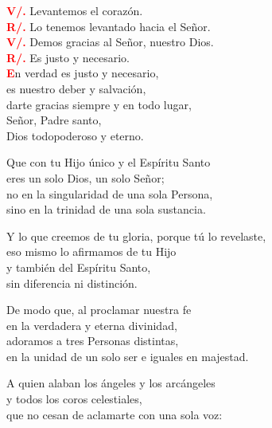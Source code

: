 \documentclass[12pt, letterpaper, spanish]{report}
\begin{document}
\Large \hspace{-0.9cm} {\bfseries \textcolor{red}{V/.}} \hspace{0.5cm} Levantemos el coraz\'on. \\
\Large \hspace{-0.9cm} {\bfseries \textcolor{red}{R/.}} \hspace{0.5cm} Lo tenemos levantado hacia el Se\~nor. \\

\Large \hspace{-0.9cm} {\bfseries \textcolor{red}{V/.}} \hspace{0.5cm} Demos gracias al Se\~nor, nuestro Dios. \\
\Large \hspace{-0.9cm} {\bfseries \textcolor{red}{R/.}} \hspace{0.5cm} Es justo y necesario. \\

\Large \lettrine{\bfseries \textcolor{red}{E}}{}n verdad es justo y necesario,\\
es nuestro deber y salvaci\'on,\\
darte gracias siempre y en todo lugar,\\
Se\~nor, Padre santo,\\
Dios todopoderoso y eterno.\newline

Que con tu Hijo \'unico y el Esp\'iritu Santo\\
eres un solo Dios, un solo Se\~nor;\\
no en la singularidad de una sola Persona,\\
sino en la trinidad de una sola sustancia.\newline

Y lo que creemos de tu gloria, porque t\'u lo revelaste,\\
eso mismo lo afirmamos de tu Hijo\\
y tambi\'en del Esp\'iritu Santo,\\
sin diferencia ni distinci\'on.\newline

De modo que, al proclamar nuestra fe\\
en la verdadera y eterna divinidad,\\
adoramos a tres Personas distintas,\\
en la unidad de un solo ser e iguales en majestad.\newline

A quien alaban los \'angeles y los arc\'angeles\\
y todos los coros celestiales,\\
que no cesan de aclamarte con una sola voz:\newline
\end{document}
